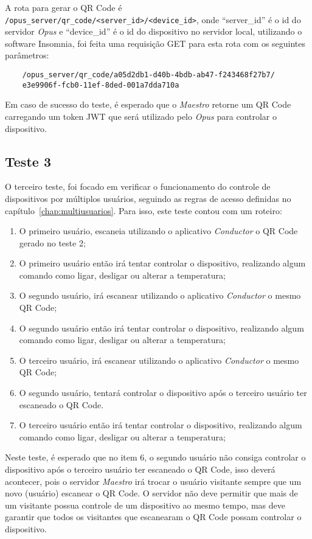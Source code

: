 A rota para gerar o QR Code é \lstinline{/opus_server/qr_code/<server_id>/<device_id>}, onde ``server\_id'' é o id do servidor \emph{Opus} e
``device\_id'' é o id do dispositivo no servidor local, utilizando o software Insomnia, foi feita uma requisição GET para esta rota com os seguintes 
parâmetros:
\begin{lstlisting}
    /opus_server/qr_code/a05d2db1-d40b-4bdb-ab47-f243468f27b7/
    e3e9906f-fcb0-11ef-8ded-001a7dda710a
\end{lstlisting}

Em caso de sucesso do teste, é esperado que o \emph{Maestro} retorne um QR Code carregando um token JWT que será utilizado 
pelo \emph{Opus} para controlar o dispositivo. 

\subsection{Teste 3}

O terceiro teste, foi focado em verificar o funcionamento do controle de dispositivos por múltiplos usuários, seguindo as regras de acesso
definidas no capítulo~\ref{chap:multiusuarios}. Para isso, este teste contou com um roteiro:
\begin{enumerate}
    \item O primeiro usuário, escaneia utilizando o aplicativo \emph{Conductor} o QR Code gerado no teste 2;
    \item O primeiro usuário então irá tentar controlar o dispositivo, realizando algum comando como ligar, desligar ou alterar a temperatura;
    \item O segundo usuário, irá escanear utilizando o aplicativo \emph{Conductor} o mesmo QR Code;
    \item O segundo usuário então irá tentar controlar o dispositivo, realizando algum comando como ligar, desligar ou alterar a temperatura;
    \item O terceiro usuário, irá escanear utilizando o aplicativo \emph{Conductor} o mesmo QR Code;
    \item O segundo usuário, tentará controlar o dispositivo após o terceiro usuário ter escaneado o QR Code.
    \item O terceiro usuário então irá tentar controlar o dispositivo, realizando algum comando como ligar, desligar ou alterar a temperatura;
\end{enumerate}

Neste teste, é esperado que no item 6, o segundo usuário não consiga controlar o dispositivo após o terceiro usuário ter escaneado o QR Code,
isso deverá acontecer, pois o servidor \emph{Maestro} irá trocar o usuário visitante sempre que um novo (usuário) escanear o QR Code. O servidor não
deve permitir que mais de um visitante possua controle de um dispositivo ao mesmo tempo, mas deve garantir que todos os visitantes que escanearam o QR Code
possam controlar o dispositivo.